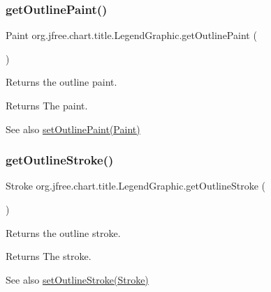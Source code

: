 \subsubsection{\texorpdfstring{get\+Outline\+Paint()}{getOutlinePaint()}}
{\footnotesize\ttfamily Paint org.\+jfree.\+chart.\+title.\+Legend\+Graphic.\+get\+Outline\+Paint (\begin{DoxyParamCaption}{ }\end{DoxyParamCaption})}

Returns the outline paint.

\begin{DoxyReturn}{Returns}
The paint.
\end{DoxyReturn}
\begin{DoxySeeAlso}{See also}
\mbox{\hyperlink{classorg_1_1jfree_1_1chart_1_1title_1_1_legend_graphic_afc046475b36b33eb947fccd915b1a44f}{set\+Outline\+Paint(\+Paint)}} 
\end{DoxySeeAlso}
\mbox{\label{classorg_1_1jfree_1_1chart_1_1title_1_1_legend_graphic_a8aaf034ed05a0cdecd32559eef6d7566}} 
\subsubsection{\texorpdfstring{get\+Outline\+Stroke()}{getOutlineStroke()}}
{\footnotesize\ttfamily Stroke org.\+jfree.\+chart.\+title.\+Legend\+Graphic.\+get\+Outline\+Stroke (\begin{DoxyParamCaption}{ }\end{DoxyParamCaption})}

Returns the outline stroke.

\begin{DoxyReturn}{Returns}
The stroke.
\end{DoxyReturn}
\begin{DoxySeeAlso}{See also}
\mbox{\hyperlink{classorg_1_1jfree_1_1chart_1_1title_1_1_legend_graphic_a64e612da91f167c9bff186af2c4eed94}{set\+Outline\+Stroke(\+Stroke)}} 
\end{DoxySeeAlso}
\mbox{\label{classorg_1_1jfree_1_1chart_1_1title_1_1_legend_graphic_ab29b7497783a46d5ed00993aed529575}} 
